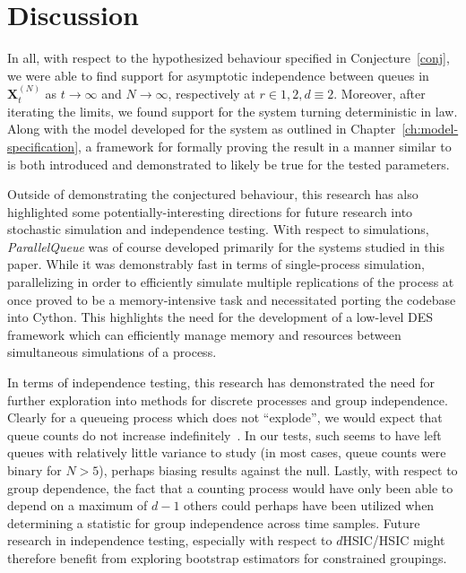 
\chapter{Discussion}\label{ch:discussion}

In all, with respect to the hypothesized behaviour specified in Conjecture~\ref{conj}, we were able to find support for asymptotic independence between queues in
$\mathbf{X}^{(N)}_{t}$ as $t\rightarrow \infty$ and $N\rightarrow \infty$, respectively at $r \in {1,2}, d \equiv 2$.
Moreover, after iterating the limits, we found support for the system turning deterministic in law.
Along with the model developed for the system as outlined in Chapter~\ref{ch:model-specification}, a framework for formally proving the result in a manner similar to~\cite{bramson_asymptotic_2012}
is both introduced and demonstrated to likely be true for the tested parameters.

Outside of demonstrating the conjectured behaviour, this research has also highlighted some potentially-interesting directions
for future research into stochastic simulation and independence testing. 
With respect to simulations, \textit{ParallelQueue} was of course developed primarily for the systems studied in this paper.
While it was demonstrably fast in terms of single-process simulation, parallelizing in order to efficiently simulate multiple replications of the process
at once proved to be a memory-intensive task and necessitated porting the codebase into Cython.
This highlights the need for the development of a low-level DES framework which can efficiently manage memory and resources between simultaneous simulations of a process.

In terms of independence testing, this research has demonstrated the need for further exploration into methods for discrete processes and group independence.
Clearly for a queueing process which does not ``explode'', we would expect that queue counts do not increase indefinitely~\cite{gardner_redundancy-d_2017}.
In our tests, such seems to have left queues with relatively little variance to study (in most cases, queue counts were binary for $N>5$), perhaps biasing results against the null.
Lastly, with respect to group dependence, the fact that a counting process would have only been able to depend on a maximum of $d-1$ others could perhaps have been utilized when determining a statistic for group independence
across time samples.
Future research in independence testing, especially with respect to $d$HSIC/HSIC might therefore benefit from exploring bootstrap estimators for constrained groupings.


